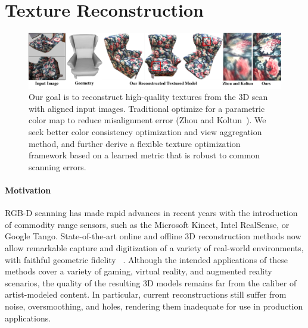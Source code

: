 \section{Texture Reconstruction}
\begin{figure}
    \centering
    \includegraphics[width=\textwidth]{texturegen/figures/teaser-n.pdf}
    \caption{Our goal is to reconstruct high-quality textures from the 3D scan with aligned input images. Traditional optimize for a parametric color map to reduce misalignment error (Zhou and Koltun~\cite{zhou2014color}). We seek better color consistency optimization and view aggregation method, and further derive a flexible texture optimization framework based on a learned metric that is robust to common scanning errors.}
    \label{fig:toptim-teaser}
\end{figure}

\label{intro:texture-recon}
\paragraph*{Motivation}
RGB-D scanning has made rapid advances in recent years with the introduction of commodity range sensors, such as the Microsoft Kinect, Intel RealSense, or Google Tango.
State-of-the-art online and offline 3D reconstruction methods now allow remarkable capture and digitization of a variety of real-world environments, with faithful geometric fidelity~ \cite{newcombe2011kinectfusion,izadi2011kinectfusion,chen2013scalable,niessner2013real,choi2015robust,dai2016bundlefusion}.
Although the intended applications of these methods cover a variety of gaming, virtual reality, and augmented reality scenarios, the quality of the resulting 3D models remains far from the caliber of artist-modeled content.
In particular, current reconstructions still suffer from noise, oversmoothing, and holes, rendering them inadequate for use in production applications.

